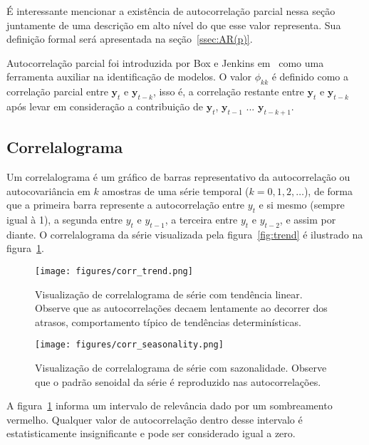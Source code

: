 É interessante mencionar a existência de autocorrelação parcial nessa seção
juntamente de uma descrição em alto nível do que esse valor representa. Sua
definição formal será apresentada na seção~\ref{ssec:AR(p)}.

Autocorrelação parcial foi introduzida por Box e Jenkins em~\cite{box} como uma
ferramenta auxiliar na identificação de modelos. O valor $\phi_{kk}$ é
definido como a correlação parcial entre $\mathbf{y}_t$ e $\mathbf{y}_{t - k}$,
isso é, a correlação restante entre $\mathbf{y}_t$ e $\mathbf{y}_{t - k}$ após
levar em consideração a contribuição de $\mathbf{y}_t$, $\mathbf{y}_{t - 1}$
$...$ $\mathbf{y}_{t - k + 1}$.

\subsection{Correlalograma}\label{ssec:correlalogram}

Um correlalograma é um gráfico de barras representativo da autocorrelação ou
autocovariância em $k$ amostras de uma série temporal ($k=0, 1, 2, \dots$), de
forma que a primeira barra represente a autocorrelação entre $y_t$ e si mesmo
(sempre igual à 1), a segunda entre $y_t$ e $y_{t-1}$, a terceira entre $y_t$ e
$y_{t-2}$, e assim por diante. O correlalograma da série visualizada pela
figura~\ref{fig:trend} é ilustrado na figura~\ref{fig:correlalogram}.

\begin{figure}
    \centering
    \texttt{[image: figures/corr\_trend.png]}
    \caption{Visualização de correlalograma de série com tendência linear.
    Observe que as autocorrelações decaem lentamente ao decorrer dos atrasos,
    comportamento típico de tendências determinísticas.}
    \label{fig:correlalogram}
\end{figure}

\begin{figure}
    \centering
    \texttt{[image: figures/corr\_seasonality.png]}
    \caption{Visualização de correlalograma de série com sazonalidade.
    Observe que o padrão senoidal da série é reproduzido nas autocorrelações.}
    \label{fig:corr_season}
\end{figure}

A figura~\ref{fig:correlalogram} informa um intervalo de relevância dado por um
sombreamento vermelho. Qualquer valor de autocorrelação dentro desse intervalo
é estatisticamente insignificante e pode ser considerado igual a zero.


